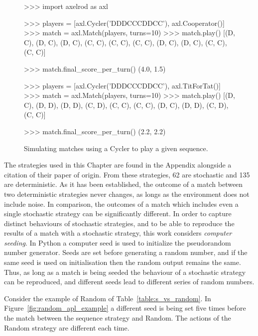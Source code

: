 \begin{figure}[!htbp]
    \begin{usagepy}
>>> import axelrod as axl

>>> players = [axl.Cycler('DDDCCCDDCC'), axl.Cooperator()]
>>> match = axl.Match(players, turns=10)
>>> match.play()
[(D, C),
 (D, C),
 (D, C),
 (C, C),
 (C, C),
 (C, C),
 (D, C),
 (D, C),
 (C, C),
 (C, C)]

>>> match.final_score_per_turn()
(4.0, 1.5)

>>> players = [axl.Cycler('DDDCCCDDCC'), axl.TitForTat()]
>>> match = axl.Match(players, turns=10)
>>> match.play()
[(D, C),
 (D, D),
 (D, D),
 (C, D),
 (C, C),
 (C, C),
 (D, C),
 (D, D),
 (C, D),
 (C, C)]

 >>> match.final_score_per_turn()
 (2.2, 2.2)
    \end{usagepy}
\caption{Simulating matches using a Cycler to play a given sequence.}\label{fig:apl_simulations_cycler}
\end{figure}

The \numberofstrategiesbestsequences strategies used in this Chapter are found
in the Appendix alongside a citation of their paper of origin.
From these \numberofstrategiesbestsequences strategies, 62 are stochastic and
135 are deterministic. As it has been established, the outcome of a match
between two deterministic strategies never changes, as longs as the environment
does not include noise. In comparison, the outcomes of a match which includes even a single
stochastic strategy can be significantly different. In order to
capture distinct behaviours of stochastic strategies, and to be able to
reproduce the results of a match with a stochastic strategy, this work considers
\textit{computer seeding}. In Python a computer seed is used to initialize the
pseudorandom number generator. Seeds are set before generating a random number,
and if the same seed is used on initialisation then the random output remains
the same. Thus, as long as a match is being seeded the behaviour of a stochastic
strategy can be reproduced, and different seeds lead to different series of
random numbers.

Consider the example of Random of Table~\ref{table:s_vs_random}. In
Figure~\ref{fig:random_apl_example} a different seed is being set five times
before the match between the sequence strategy and Random. The actions of the
Random strategy are different each time.

